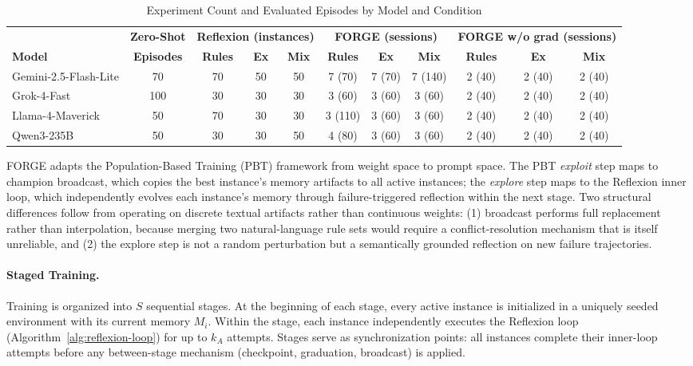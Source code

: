 \documentclass[sigconf]{acmart}
\begin{document}
\begin{table}[t]
  \centering
  \small
  \centering
  \caption{Experiment Count and Evaluated Episodes by Model and Condition}
  \label{tab:experiment_breakdown}
  \begin{tabular}{l c ccc ccc ccc}
  \toprule
  & \textbf{Zero-Shot} & \multicolumn{3}{c}{\textbf{Reflexion (instances)}} & \multicolumn{3}{c}{\textbf{FORGE (sessions)}} & \multicolumn{3}{c}{\textbf{FORGE w/o grad (sessions)}} \\
  \cmidrule(lr){3-5}\cmidrule(lr){6-8}\cmidrule(lr){9-11}
  \textbf{Model} & \textbf{Episodes}
    & \textbf{Rules} & \textbf{Ex} & \textbf{Mix}
    & \textbf{Rules} & \textbf{Ex} & \textbf{Mix}
    & \textbf{Rules} & \textbf{Ex} & \textbf{Mix} \\
  \midrule
  Gemini-2.5-Flash-Lite & 70 & 70 & 50 & 50 & 7 (70) & 7 (70) & 7 (140) & 2 (40) & 2 (40) & 2 (40) \\
  Grok-4-Fast & 100 & 30 & 30 & 30 & 3 (60) & 3 (60) & 3 (60) & 2 (40) & 2 (40) & 2 (40) \\
  Llama-4-Maverick & 50 & 70 & 30 & 30 & 3 (110) & 3 (60) & 3 (60) & 2 (40) & 2 (40) & 2 (40) \\
  Qwen3-235B & 50 & 30 & 30 & 50 & 4 (80) & 3 (60) & 3 (60) & 2 (40) & 2 (40) & 2 (40) \\
  \bottomrule
  \end{tabular}
 \end{table}

FORGE adapts the Population-Based Training (PBT) framework \citep{jaderberg2017pbt} from weight space to prompt space. The PBT \emph{exploit} step maps to champion broadcast, which copies the best instance's memory artifacts to all active instances; the \emph{explore} step maps to the Reflexion inner loop, which independently evolves each instance's memory through failure-triggered reflection within the next stage. Two structural differences follow from operating on discrete textual artifacts rather than continuous weights: (1) broadcast performs full replacement rather than interpolation, because merging two natural-language rule sets would require a conflict-resolution mechanism that is itself unreliable, and (2) the explore step is not a random perturbation but a semantically grounded reflection on new failure trajectories.


\paragraph{Staged Training.}
Training is organized into $S$ sequential stages. At the beginning of each stage, every active instance is initialized in a uniquely seeded environment with its current memory $M_i$. Within the stage, each instance independently executes the Reflexion loop (Algorithm~\ref{alg:reflexion-loop}) for up to $k_A$ attempts. Stages serve as synchronization points: all instances complete their inner-loop attempts before any between-stage mechanism (checkpoint, graduation, broadcast) is applied.
\end{document}
